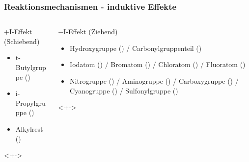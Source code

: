 \begin{frame}
\frametitle{Reaktionsmechanismen - induktive Effekte}
\begin{columns}
\begin{column}{0.48\textwidth}
\begin{block}{$+\text{I}$-Effekt (Schiebend)}
\begin{itemize}
	\item t-Butylgruppe ()
	\item i-Propylgruppe ()
	\item Alkylrest ()
\end{itemize}
\end{block}
\begin{examples}<+->
\end{examples}
\end{column}
\begin{column}{0.48\textwidth}
\begin{block}{$-\text{I}$-Effekt (Ziehend)}
\begin{itemize}
	\item Hydroxygruppe () / Carbonylgruppenteil ()
	\item Iodatom () / Bromatom () / Chloratom () / Fluoratom ()
	\item Nitrogruppe () / Aminogruppe () / Carboxygruppe () / Cyanogruppe () / Sulfonylgruppe ()
\end{itemize}
\end{block}
\begin{examples}<+->
\end{examples}
\end{column}
\end{columns}
\end{frame}
